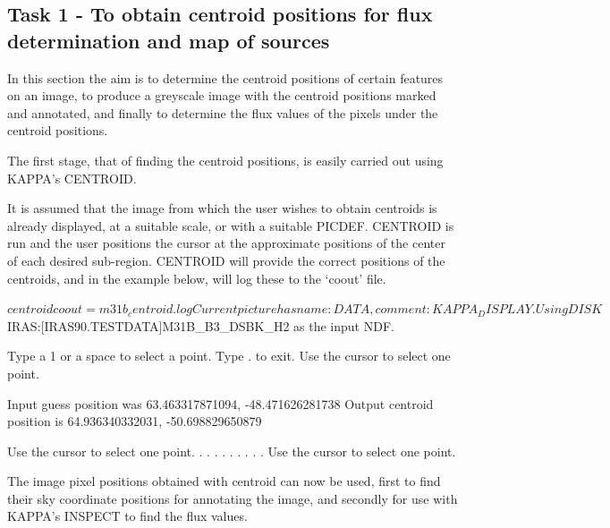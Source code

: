 \documentclass[twoside,11pt]{starlink}
\begin{document}
\subsection {Task 1  - To obtain centroid positions for flux determination and
map of sources}
\label{a:exkappa1}
In this section the aim is to determine the centroid positions of certain
features on an image, to produce a greyscale image with the centroid positions
marked and annotated, and finally to determine the flux values of the pixels
under the centroid positions.

The first stage, that of finding the centroid positions, is easily carried out
using KAPPA's CENTROID.

It is assumed that the image from which the user wishes to obtain centroids is
already displayed, at a suitable scale, or with a suitable PICDEF. CENTROID is
run and the user positions the cursor at the approximate positions of
the center of each desired sub-region. CENTROID will provide the correct
positions of the centroids, and in the example below, will log these to the
`coout' file.
\begin{small}
\begin{terminalv}
$ centroid coout=m31b_centroid.log
Current picture has name: DATA, comment: KAPPA_DISPLAY.
Using DISK$IRAS:[IRAS90.TESTDATA]M31B_B3_DSBK_H2 as the input NDF.

Type a 1 or a space to select a point.
Type . to exit.
Use the cursor to select one point.

Input guess position was     63.463317871094, -48.471626281738
Output centroid position is  64.936340332031, -50.698829650879

Use the cursor to select one point.
           .                      .                 .
           .                      .                 .
           .                      .                 .
Use the cursor to select one point.
\end{terminalv}
\end{small}

The image pixel positions obtained with centroid can now be used, first to
find their sky coordinate positions for annotating the image, and secondly
for use with KAPPA's INSPECT to find the flux values.
\begin{small}
\end{small}
\end{document}
